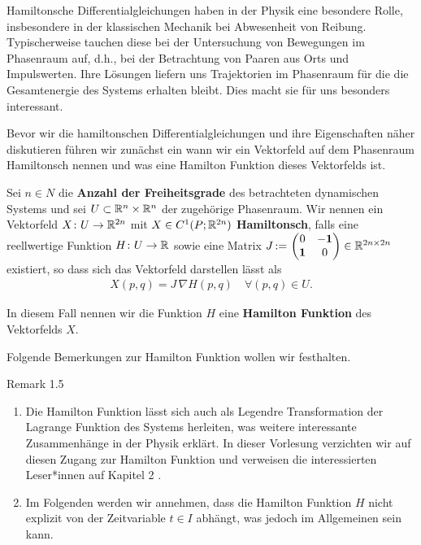 \par
Hamiltonsche Differentialgleichungen haben in der Physik eine besondere Rolle, insbesondere in der klassischen Mechanik bei Abwesenheit von Reibung.
Typischerweise tauchen diese bei der Untersuchung von Bewegungen im Phasenraum auf, d.h., bei der Betrachtung von Paaren aus Orts  und Impulswerten.
Ihre Lösungen liefern uns Trajektorien im Phasenraum für die die Gesamtenergie des Systems erhalten bleibt.
Dies macht sie für uns besonders interessant.

\par
Bevor wir die hamiltonschen Differentialgleichungen und ihre Eigenschaften näher diskutieren führen wir zunächst ein wann wir ein Vektorfeld auf dem Phasenraum Hamiltonsch nennen und was eine Hamilton Funktion dieses Vektorfelds ist.
\label{ode/hamilton:def:hamiltonsch}
\begin{definition}{}{}



\par
Sei \(n \in N\) die \textbf{Anzahl der Freiheitsgrade} des betrachteten dynamischen Systems und sei \(U\subset \mathbb{R}^n \times \mathbb{R}^n\) der zugehörige Phasenraum.
Wir nennen ein Vektorfeld \(X \colon U \rightarrow \mathbb{R}^{2n}\) mit \(X \in C^1(P;\mathbb{R}^{2n})\) \textbf{Hamiltonsch}, falls eine reellwertige Funktion \(H \colon U \rightarrow \mathbb{R}\) sowie eine Matrix \(J \, {:=} \, \begin{pmatrix}0 & -\mathbf{1}\\ \mathbf{1} & 0 \end{pmatrix} \in \mathbb{R}^{2n \times 2n}\) existiert, so dass sich das Vektorfeld darstellen lässt als
\begin{align}\label{equation:ode/hamilton:eq:hamilton_Gleichung}
X(p,q) = J \, \nabla H (p,q) \quad \forall (p,q) \in U.
\end{align}
\par
In diesem Fall nennen wir die Funktion \(H\) eine \textbf{Hamilton Funktion} des Vektorfelds \(X\).
\end{definition}

\par
Folgende Bemerkungen zur Hamilton Funktion wollen wir festhalten.
\label{ode/hamilton:remark-1}
\begin{emphBox}{}{}{Remark 1.5}


\begin{enumerate}

\item {} 
\par
Die Hamilton Funktion lässt sich auch als Legendre Transformation der Lagrange Funktion des Systems herleiten, was weitere interessante Zusammenhänge in der Physik erklärt.
In dieser Vorlesung verzichten wir auf diesen Zugang zur Hamilton Funktion und verweisen die interessierten Leser*innen auf Kapitel 2 \cite{Nol11}.

\item {} 
\par
Im Folgenden werden wir annehmen, dass die Hamilton Funktion \(H\) nicht explizit von der Zeitvariable \(t \in I\) abhängt, was jedoch im Allgemeinen sein kann.

\end{enumerate}
\end{emphBox}

